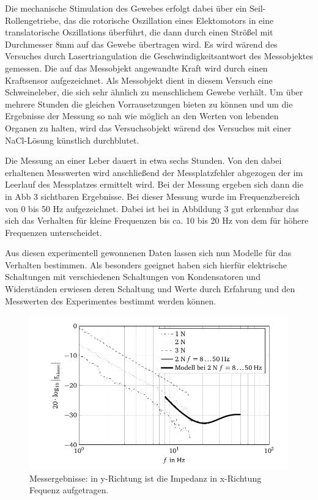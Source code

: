 \documentclass[11pt]{article}
\begin{document}
		 Die mechanische Stimulation des Gewebes erfolgt dabei über ein Seil-Rollengetriebe, das 
		 die rotorische Oszillation eines Elektomotors in eine translatorische Oszillations 	
		 überführt, die dann durch einen Strößel mit Durchmesser 8mm auf das Gewebe übertragen 
		 wird. Es wird wärend des Versuches durch Lasertriangulation die Geschwindigkeitsantwort 
		 des Messobjektes gemessen. Die auf das 
		 Messobjekt angewandte Kraft wird durch einen Kraftsensor aufgezeichnet. Als Messobjekt 
		 dient in diesem Versuch eine Schweineleber, die sich sehr ähnlich zu menschlichem Gewebe 
		 verhält. Um über mehrere Stunden die gleichen Vorrausetzungen bieten zu können und um die 
		 Ergebnisse der Messung so nah wie möglich an den Werten von lebenden Organen zu halten, 
		 wird das Versuchsobjekt wärend des Versuches mit einer NaCl-Lösung künstlich durchblutet.
		 
		 Die Messung an einer Leber dauert in etwa sechs Stunden. Von den dabei erhaltenen 
		 Messwerten wird anschließend der Messplatzfehler abgezogen der im Leerlauf des Messplatzes 
		 ermittelt wird. Bei der Messung ergeben sich dann die in Abb 3 sichtbaren Ergebnisse. Bei 
		 dieser Messung wurde im Frequenzbereich von 0 bis 50 Hz  aufgezeichnet. Dabei ist bei 
		 in Abbildung 3 gut erkennbar das sich das Verhalten für kleine Frequenzen bis ca. 10 bis 	
		 20 Hz von dem für höhere Frequenzen unterscheidet. 
		 
		 Aus diesen experimentell gewonnenen Daten lassen sich nun Modelle für das Verhalten 
		 bestimmen. Als besonders geeignet haben sich hierfür elektrische Schaltungen mit 
		 verschiedenen Schaltungen von Kondensatoren und Widerständen erwiesen deren Schaltung 
		 und Werte durch Erfahrung und den Messwerten des Experimentes bestimmt werden können.
		  
		 
		 \begin{figure}[h!]
		  \centering
			\includegraphics[width=\textwidth]{messerg.png}
			\caption{Messergebnisse: in y-Richtung ist die Impedanz in x-Richtung Fequenz aufgetragen.}
		\end{figure} 
		
\end{document}
